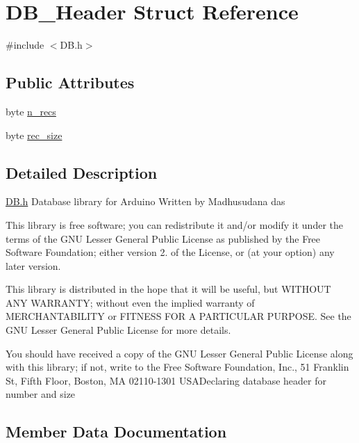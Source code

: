 \hypertarget{struct_d_b___header}{}\section{D\+B\+\_\+\+Header Struct Reference}
\label{struct_d_b___header}


{\ttfamily \#include $<$D\+B.\+h$>$}

\subsection*{Public Attributes}
\begin{DoxyCompactItemize}
\item 
byte \hyperlink{struct_d_b___header_a8cca2e4c4f81d4eab5fb7eb53716a10b}{n\+\_\+recs}
\item 
byte \hyperlink{struct_d_b___header_a47a513477cb101a6e44cc75eb497506d}{rec\+\_\+size}
\end{DoxyCompactItemize}


\subsection{Detailed Description}
\hyperlink{_d_b_8h_source}{D\+B.\+h} Database library for Arduino Written by Madhusudana das

This library is free software; you can redistribute it and/or modify it under the terms of the G\+N\+U Lesser General Public License as published by the Free Software Foundation; either version 2. of the License, or (at your option) any later version.

This library is distributed in the hope that it will be useful, but W\+I\+T\+H\+O\+U\+T A\+N\+Y W\+A\+R\+R\+A\+N\+T\+Y; without even the implied warranty of M\+E\+R\+C\+H\+A\+N\+T\+A\+B\+I\+L\+I\+T\+Y or F\+I\+T\+N\+E\+S\+S F\+O\+R A P\+A\+R\+T\+I\+C\+U\+L\+A\+R P\+U\+R\+P\+O\+S\+E. See the G\+N\+U Lesser General Public License for more details.

You should have received a copy of the G\+N\+U Lesser General Public License along with this library; if not, write to the Free Software Foundation, Inc., 51 Franklin St, Fifth Floor, Boston, M\+A 02110-\/1301 U\+S\+A\+Declaring database header for number and size 

\subsection{Member Data Documentation}
\hypertarget{struct_d_b___header_a8cca2e4c4f81d4eab5fb7eb53716a10b}{}
